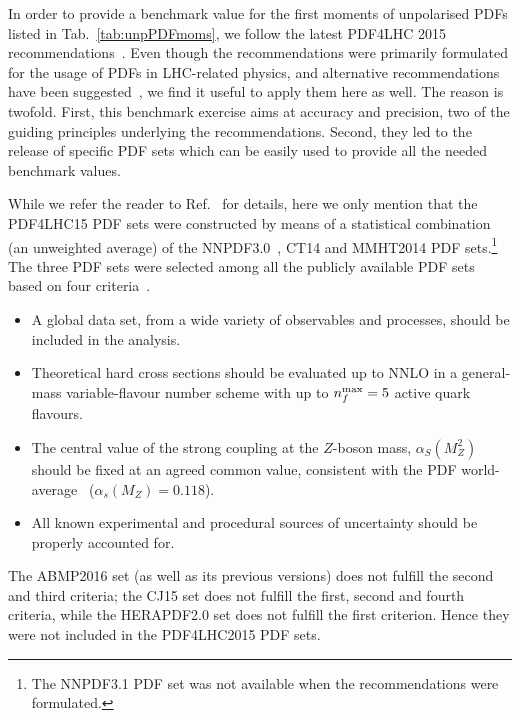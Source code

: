 In order to provide a benchmark value for the first moments of unpolarised PDFs
listed in Tab.~\ref{tab:unpPDFmoms}, we follow the latest PDF4LHC 2015 
recommendations~\cite{Butterworth:2015oua}.
%
Even though the recommendations were primarily formulated for the usage of PDFs
in LHC-related physics, and alternative recommendations have been 
suggested~\cite{Accardi:2016ndt}, we find it useful to apply them here as well.
%
The reason is twofold.
%
First, this benchmark exercise aims at accuracy and precision,  
two of the guiding principles underlying the recommendations.
%
Second, they led to the release of specific PDF sets which can be easily 
used to provide all the needed benchmark values.

While we refer the reader to Ref.~\cite{Butterworth:2015oua} for details,
here we only mention that the PDF4LHC15 PDF sets were constructed by means of
a statistical combination (an unweighted average) of the 
NNPDF3.0~\cite{Ball:2014uwa}, CT14 and MMHT2014 PDF sets.\footnote{The 
NNPDF3.1 PDF set was not available when the recommendations were formulated.}
%
The three PDF sets were selected among all the publicly available PDF sets
based on four criteria~\cite{Butterworth:2015oua}.
%
\begin{itemize}
%
\item A global data set, from a wide variety of observables and processes, 
should be included in the analysis.
%
\item Theoretical hard cross sections should be evaluated up to NNLO in a
general-mass variable-flavour number scheme with up to $n_f^{\rm max}=5$ 
active quark flavours.
%
\item The central value of the strong coupling at the $Z$-boson mass,
$\alpha_S(M_Z^2)$ should be fixed at an agreed common value, consistent 
with the PDF world-average~\cite{Olive:2016xmw} ($\alpha_s(M_Z)=0.118$).
%
\item All known experimental and procedural sources of uncertainty should be 
properly accounted for.
%
\end{itemize}
%
The ABMP2016 set (as well as its previous versions) does not fulfill the second 
and third criteria; the CJ15 set does not fulfill the first, second and fourth
criteria, while the HERAPDF2.0 set does not fulfill the first criterion.
%
Hence they were not included in the PDF4LHC2015 PDF sets.


